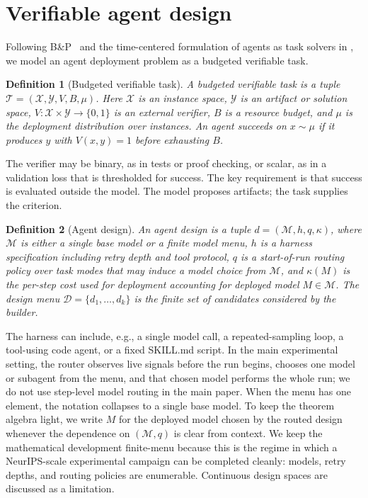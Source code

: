 \documentclass{article}
\newtheorem{definition}{Definition}
\newcommand{\cD}{\mathcal{D}}
\newcommand{\cT}{\mathcal{T}}
\newcommand{\cX}{\mathcal{X}}
\newcommand{\cY}{\mathcal{Y}}
\begin{document}
\section{Verifiable agent design}
\label{sec:setup}

Following B\&P~\citep{bp_task_definition_placeholder} and the time-centered formulation of agents as task solvers in \citet{achille2025agents}, we model an agent deployment problem as a budgeted verifiable task.

\begin{definition}[Budgeted verifiable task]
\label{def:task}
A budgeted verifiable task is a tuple
$\cT=(\cX,\cY,V,B,\mu)$.
Here $\cX$ is an instance space, $\cY$ is an artifact or solution space, $V:\cX\times\cY\to\{0,1\}$ is an external verifier, $B$ is a resource budget, and $\mu$ is the deployment distribution over instances.
An agent succeeds on $x\sim\mu$ if it produces $y$ with $V(x,y)=1$ before exhausting $B$.
\end{definition}

The verifier may be binary, as in tests or proof checking, or scalar, as in a validation loss that is thresholded for success.
The key requirement is that success is evaluated outside the model.
The model proposes artifacts; the task supplies the criterion.

\begin{definition}[Agent design]
\label{def:design}
An agent design is a tuple
$d=(\mathcal M,h,q,\kappa)$, where $\mathcal M$ is either a single base model or a finite model menu, $h$ is a harness specification including retry depth and tool protocol, $q$ is a start-of-run routing policy over task modes that may induce a model choice from $\mathcal M$, and $\kappa(M)$ is the per-step cost used for deployment accounting for deployed model $M\in\mathcal M$.
The design menu $\cD=\{d_1,\ldots,d_k\}$ is the finite set of candidates considered by the builder.
\end{definition}

The harness can include, e.g., a single model call, a repeated-sampling loop, a tool-using code agent, or a fixed SKILL.md script.
In the main experimental setting, the router observes live signals before the run begins, chooses one model or subagent from the menu, and that chosen model performs the whole run; we do not use step-level model routing in the main paper.
When the menu has one element, the notation collapses to a single base model.
To keep the theorem algebra light, we write $M$ for the deployed model chosen by the routed design whenever the dependence on $(\mathcal M,q)$ is clear from context.
We keep the mathematical development finite-menu because this is the regime in which a NeurIPS-scale experimental campaign can be completed cleanly: models, retry depths, and routing policies are enumerable.
Continuous design spaces are discussed as a limitation.
\end{document}
